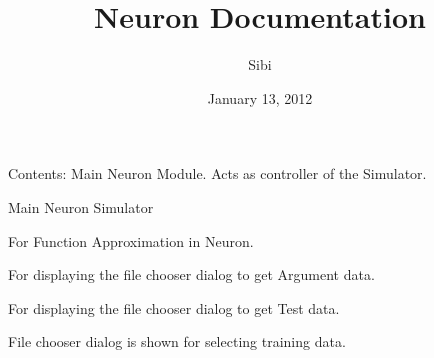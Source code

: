 \documentclass[letterpaper,10pt,english]{sphinxmanual}
\title{Neuron Documentation}
\date{January 13, 2012}
\author{Sibi}
\begin{document}
\maketitle
\tableofcontents
{}\label{index::doc}


Contents:
\label{index:module-neuron}
Main Neuron Module. Acts as controller of the Simulator.


\begin{fulllineitems}
\label{index:neuron.neuron}
Main Neuron Simulator


\begin{fulllineitems}
\label{index:neuron.neuron.approximate}
For Function Approximation in Neuron.

\end{fulllineitems}



\begin{fulllineitems}
\label{index:neuron.neuron.get_argument_data}
For displaying the file chooser dialog to get
Argument data.

\end{fulllineitems}



\begin{fulllineitems}
\label{index:neuron.neuron.get_test_data}
For displaying the file chooser dialog to get
Test data.

\end{fulllineitems}



\begin{fulllineitems}
\label{index:neuron.neuron.get_training_data}
File chooser dialog is shown for selecting training data.


\end{fulllineitems}
\end{fulllineitems}
\end{document}
